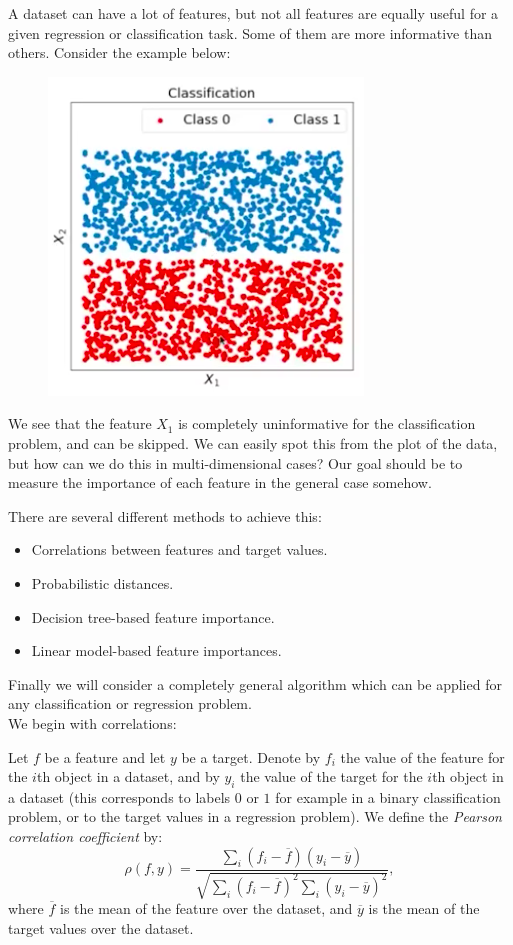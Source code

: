 A dataset can have a lot of features, but not all features are equally useful for a given regression or classification task. Some of them are more informative than others. Consider the example below:

\begin{figure}[H]
\centering
\includegraphics[scale=0.4]{uselessfeature.png}
\end{figure}

We see that the feature $X_1$ is completely uninformative for the classification problem, and can be skipped. We can easily spot this from the plot of the data, but how can we do this in multi-dimensional cases? Our goal should be to measure the importance of each feature in the general case somehow.






\newpage
There are several different methods to achieve this:
\begin{itemize}
\item Correlations between features and target values.
\item Probabilistic distances.
\item Decision tree-based feature importance.
\item Linear model-based feature importances.
\end{itemize}
Finally we will consider a completely general algorithm which can be applied for any classification or regression problem.\\

We begin with correlations:
\begin{framedef}
Let $f$ be a feature and let $y$ be a target. Denote by $f_i$ the value of the feature for the $i$th object in a dataset, and by $y_i$ the value of the target for the $i$th object in a dataset (this corresponds to labels $0$ or $1$ for example in a binary classification problem, or to the target values in a regression problem). We define the \textit{Pearson correlation coefficient} by:
\begin{equation*}
\rho(f, y) = \frac{\displaystyle \sum_{i} (f_i - \overline{f})(y_i - \overline{y})}{\sqrt{\displaystyle \sum_{i} (f_i - \overline{f})^2 \sum_{i} (y_i - \overline{y})^2}},
\end{equation*}
where $\overline{f}$ is the mean of the feature over the dataset, and $\overline{y}$ is the mean of the target values over the dataset. 
\end{framedef}

